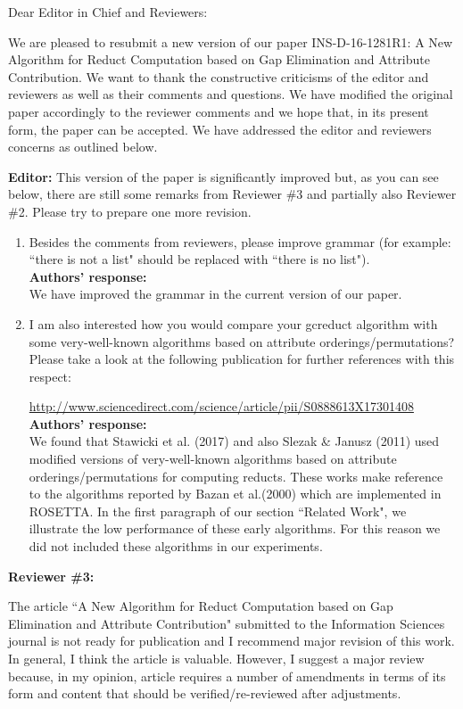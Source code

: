 \documentclass{letter}
\begin{document}
\begin{letter}{}
  \opening{Dear Editor in Chief and Reviewers:}

  We are pleased to resubmit a new version of our paper INS-D-16-1281R1: A New Algorithm for Reduct Computation based on Gap Elimination and Attribute Contribution. We want to thank the constructive criticisms of the editor and reviewers as well as their comments and questions. We have modified the original paper accordingly to the reviewer comments and we hope that, in its present form, the paper can be accepted. We have addressed the editor and reviewers concerns as outlined below.

  \textbf{Editor:} 
  This version of the paper is significantly improved but, as you can see below, there are still some remarks from Reviewer \#3 and partially also Reviewer \#2. Please try to prepare one more revision.
  \begin{enumerate}
	\item Besides the comments from reviewers, please improve grammar (for example: ``there is not a list" should be replaced with ``there is no list"). \\
	\textbf{Authors’ response:} \\
	We have improved the grammar in the current version of our paper.
		 
	\item I am also interested how you would compare your gcreduct algorithm with some very-well-known algorithms based on attribute orderings/permutations? Please take a look at the following publication for further references with this respect:
  
	\url{http://www.sciencedirect.com/science/article/pii/S0888613X17301408}\\
	\textbf{Authors’ response:} \\
	We found that Stawicki et al. (2017) and also Slezak \& Janusz (2011) used modified versions of very-well-known algorithms based on attribute orderings/permutations for computing reducts. These works make reference to the algorithms reported by Bazan et al.(2000) which are implemented in ROSETTA. In the first paragraph of our section ``Related Work", we illustrate the low performance of these early algorithms. For this reason we did not included these algorithms in our experiments.
  \end{enumerate}
  
  \textbf{Reviewer \#3:}
  
  The article ``A New Algorithm for Reduct Computation based on Gap Elimination and Attribute Contribution" submitted to the Information Sciences journal is not ready for publication and I recommend major revision of this work. In general, I think the article is valuable. However, I suggest a major review because, in my opinion, article requires a number of amendments in terms of its form and content that should be verified/re-reviewed after adjustments.
 

\end{letter}
\end{document}
